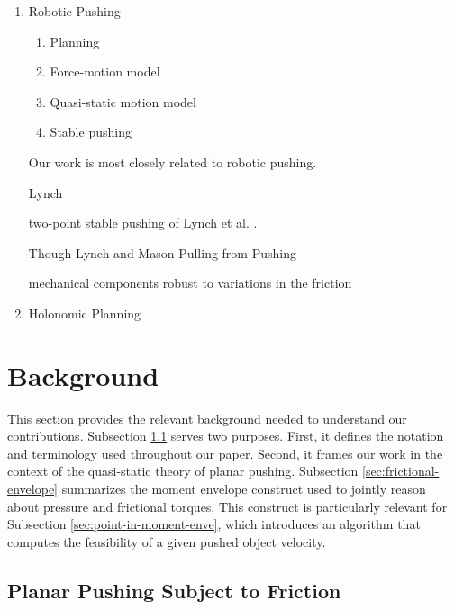 \documentclass[conference]{IEEEtran}
\newcommand{\BB}[1]{{\color{red} {Byron: {#1}}}}
\begin{document}
\begin{enumerate}
\item Robotic Pushing
  \begin{enumerate}
  \item Planning
  \item Force-motion model
  \item Quasi-static motion model
  \item Stable pushing
  \end{enumerate}

  Our work is most closely related to robotic pushing.

  Lynch 

  two-point stable pushing of Lynch et al. \cite{}.

  Though Lynch and Mason Pulling from Pushing \cite{lynch1995pulling}

  mechanical components robust to variations in the friction

\item Holonomic Planning
\end{enumerate}

\section{Background}\label{sec:background}
This section provides the relevant background needed to understand our
contributions. Subsection \ref{sec:plan-push-subj} serves two
purposes. First, it defines the notation and terminology used
throughout our paper. Second, it frames our work in the context of the
quasi-static theory of planar pushing. Subsection
\ref{sec:frictional-envelope} summarizes the moment envelope construct
used to jointly reason about pressure and frictional torques. This
construct is particularly relevant for Subsection
\ref{sec:point-in-moment-enve}, which introduces an algorithm that
computes the feasibility of a given pushed object velocity.




\subsection{Planar Pushing Subject to Friction}\label{sec:plan-push-subj}
\end{document}

